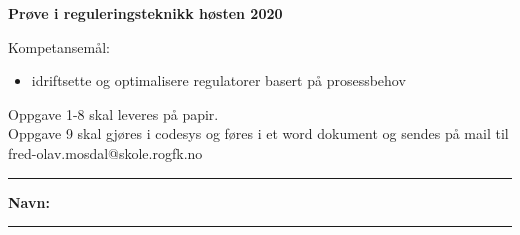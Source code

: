 \centerline{\bf Prøve i reguleringsteknikk høsten 2020}  \bigskip

Kompetansemål:
\begin{itemize}[noitemsep]

	\item idriftsette og optimalisere regulatorer basert på prosessbehov
\end{itemize}

Oppgave 1-8 skal leveres på papir. \\
Oppgave 9 skal gjøres i codesys og føres i et word  dokument og sendes på mail til fred-olav.mosdal@skole.rogfk.no\\

\bigskip 
\hrule
\bigskip 
\textbf{Navn:}\bigskip 
\hrule
\vfil \eject
